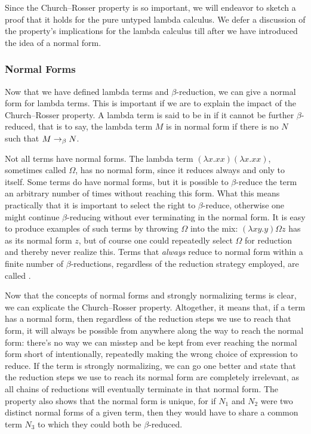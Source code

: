 Since the Church--Rosser property is so important, we will endeavor to sketch a proof that it holds for the pure untyped lambda calculus. We defer a discussion of the property's implications for the lambda calculus till after we have introduced the idea of a normal form.%

\subsubsection{Normal Forms}\label{untyped:nf}
Now that we have defined lambda terms and $\beta$-reduction, we can give a normal form for lambda terms. This is important if we are to explain the impact of the Church--Rosser property. A lambda term is said to be in  if it cannot be further $\beta$-reduced, that is to say, the lambda term $M$ is in normal form if there is no $N$ such that $M \betared N$.

Not all terms have normal forms. The lambda term $(\lambda x.xx)(\lambda x.xx)$, sometimes called $\Omega$, has no normal form, since it reduces always and only to itself. Some terms do have normal forms, but it is possible to $\beta$-reduce the term an arbitrary number of times without reaching this form. What this means practically that it is important to select the right  to $\beta$-reduce, otherwise one might continue $\beta$-reducing without ever terminating in the normal form. It is easy to produce examples of such terms by throwing $\Omega$ into the mix: $(\lambda xy.y) \Omega z$ has as its normal form $z$, but of course one could repeatedly select $\Omega$ for reduction and thereby never realize this. Terms that \emph{always} reduce to normal form within a finite number of $\beta$-reductions, regardless of the reduction strategy employed, are called .

Now that the concepts of normal forms and strongly normalizing terms is clear, we can explicate the Church--Rosser property. Altogether, it means that, if a term has a normal form, then regardless of the reduction steps we use to reach that form, it will always be possible from anywhere along the way to reach the normal form: there's no way we can misstep and be kept from ever reaching the normal form short of intentionally, repeatedly making the wrong choice of expression to reduce. If the term is strongly normalizing, we can go one better and state that the reduction steps we use to reach its normal form are completely irrelevant, as all chains of reductions will eventually terminate in that normal form. The property also shows that the normal form is unique, for if $N_{1}$ and $N_{2}$ were two distinct normal forms of a given term, then they would have to share a common term $N_{3}$ to which they could both be $\beta$-reduced.

